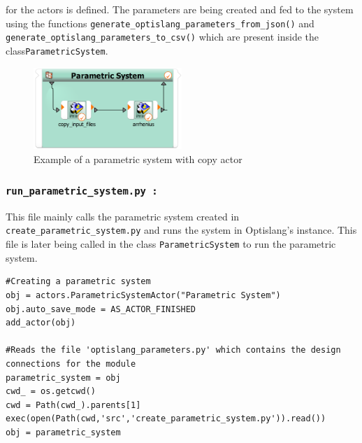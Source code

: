 for the actors is defined. The parameters are being created and fed to the system using the functions \texttt{generate\_optislang\_parameters\_from\_json()} and
\texttt{generate\_optislang\_parameters\_to\_csv()} which are present inside the class\texttt{ParametricSystem}. 
\begin{figure}[!ht]
  \centering
  \includegraphics[width=0.5\textwidth]{Images/parametric_system_with_copy_actor.png}
  \caption{Example of a parametric system with copy actor}
  \label{parametric_system_with_copy_actor}
\end{figure}

\subsubsection{\textbf{\texttt{run\_parametric\_system.py :}}}
This file mainly calls the parametric system created in \texttt{create\_parametric\_system.py} and runs the system in Optislang's instance. This file is later
being called in the class \texttt{ParametricSystem} to run the parametric system. 
\renewcommand{\lstlistingname}{Code}
\begin{lstlisting}[style=pythoncode, caption={Overivew of \texttt{run\_parametric\_system.py}}, label={run_parametric_system}]
#Creating a parametric system
obj = actors.ParametricSystemActor("Parametric System")
obj.auto_save_mode = AS_ACTOR_FINISHED
add_actor(obj)

#Reads the file 'optislang_parameters.py' which contains the design connections for the module
parametric_system = obj
cwd_ = os.getcwd()
cwd = Path(cwd_).parents[1]
exec(open(Path(cwd,'src','create_parametric_system.py')).read())
obj = parametric_system
\end{lstlisting}

